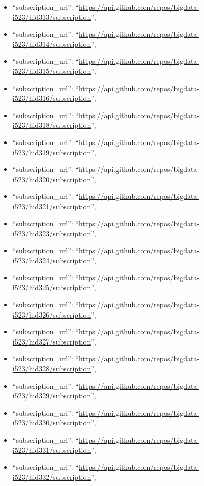 \begin{itemize}
\item
  ``subscription\_url'':
  ``\url{https://api.github.com/repos/bigdata-i523/hid313/subscription}'',
\item
  ``subscription\_url'':
  ``\url{https://api.github.com/repos/bigdata-i523/hid314/subscription}'',
\item
  ``subscription\_url'':
  ``\url{https://api.github.com/repos/bigdata-i523/hid315/subscription}'',
\item
  ``subscription\_url'':
  ``\url{https://api.github.com/repos/bigdata-i523/hid316/subscription}'',
\item
  ``subscription\_url'':
  ``\url{https://api.github.com/repos/bigdata-i523/hid318/subscription}'',
\item
  ``subscription\_url'':
  ``\url{https://api.github.com/repos/bigdata-i523/hid319/subscription}'',
\item
  ``subscription\_url'':
  ``\url{https://api.github.com/repos/bigdata-i523/hid320/subscription}'',
\item
  ``subscription\_url'':
  ``\url{https://api.github.com/repos/bigdata-i523/hid321/subscription}'',
\item
  ``subscription\_url'':
  ``\url{https://api.github.com/repos/bigdata-i523/hid323/subscription}'',
\item
  ``subscription\_url'':
  ``\url{https://api.github.com/repos/bigdata-i523/hid324/subscription}'',
\item
  ``subscription\_url'':
  ``\url{https://api.github.com/repos/bigdata-i523/hid325/subscription}'',
\item
  ``subscription\_url'':
  ``\url{https://api.github.com/repos/bigdata-i523/hid326/subscription}'',
\item
  ``subscription\_url'':
  ``\url{https://api.github.com/repos/bigdata-i523/hid327/subscription}'',
\item
  ``subscription\_url'':
  ``\url{https://api.github.com/repos/bigdata-i523/hid328/subscription}'',
\item
  ``subscription\_url'':
  ``\url{https://api.github.com/repos/bigdata-i523/hid329/subscription}'',
\item
  ``subscription\_url'':
  ``\url{https://api.github.com/repos/bigdata-i523/hid330/subscription}'',
\item
  ``subscription\_url'':
  ``\url{https://api.github.com/repos/bigdata-i523/hid331/subscription}'',
\item
  ``subscription\_url'':
  ``\url{https://api.github.com/repos/bigdata-i523/hid332/subscription}'',

\end{itemize}
